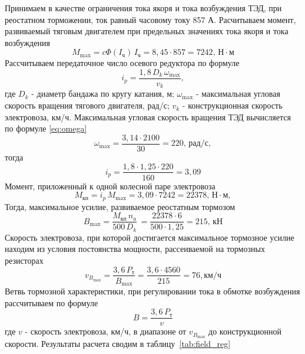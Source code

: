 Принимаем в качестве ограничения тока якоря и тока возбуждения ТЭД,  при реостатном торможении, ток равный часовому току 857 А. Расчитываем момент, развиваемый тяговым двигателем при предельных значениях тока якоря и тока возбуждения
\begin{equation*}
 M_{\max} = c\Phi(I_{\text{ч}}) \, I_{\text{ч}} = 8,45 \cdot 857 = 7242, \, \text{Н} \cdot \text{м} 
\end{equation*}
Рассчитываем передаточное число осевого редуктора по формуле
\begin{equation}
 \label{eq:reductor}
 i_p = \frac{1,8 \, D_k \, \omega_{\max}}{v_k},
\end{equation}
где $D_k$ - диаметр бандажа по кругу катания, м; $\omega_{\max}$ - максимальная угловая скорость вращения тягового двигателя, рад/с; $v_k$ - конструкционная скорость электровоза, км/ч. Максимальная угловая скорость вращения ТЭД вычисляется по формуле \eqref{eq:omega}
\begin{equation*}
 \omega_{\max} = \frac{3,14 \cdot 2100}{30} = 220, \, \text{рад/с},
\end{equation*}
тогда
\begin{equation*}
 i_p = \frac{1,8 \cdot 1,25 \cdot 220}{160} = 3,09
\end{equation*}
Момент, приложенный к одной колесной паре электровоза
\begin{equation*}
 M_{\text{кп}} = i_p \, M_{\max} = 3,09 \cdot 7242 = 22378, \, \text{Н} \cdot \text{м},
\end{equation*}
Тогда, максимальное усилие, развиваемое реостатным тормозом
\begin{equation*}
 B_{\max} = \frac{M_{\text{кп}} \, n_a}{ 500 \, D_k} \,  = \frac{22378 \cdot 6}{500 \cdot 1,25} = 215, \, \text{кН} 
\end{equation*}
Скорость электровоза, при которой достигается максимальное тормозное усилие находим из условия постоянства мощности, рассеиваемой на тормозных резисторах
\begin{equation*}
 v_{B_{\max}} = \frac{3,6 \, P_{\text{т}}}{B_{\max}} = \frac{3,6 \cdot 4560}{215} = 76, \text{км/ч} 
\end{equation*}
Ветвь тормозной характеристики, при регулировании тока в обмотке возбуждения рассчитываем по формуле
\begin{equation}
 \label{eq:field_reg}
 B = \frac{3,6 \, P_{\text{т}}}{v}
\end{equation}
где $v$ - скорость электровоза, км/ч, в диапазоне от $v_{B_{\max}}$ до конструкционной скорости. Результаты расчета сводим в таблицу~\ref{tab:field_reg}

